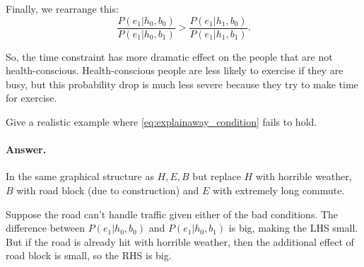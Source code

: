 \documentclass{discussion}
\begin{document}
Finally, we rearrange this:
\begin{equation}
\label{eq:explainaway_condition}
	\frac{P(e_1 | h_0, b_0)}{P(e_1 | h_0, b_1)} > \frac{P(e_1|h_1,b_0)}{P(e_1|h_1,b_1)}.
\end{equation}

So, the time constraint has more dramatic effect on the people that are not health-conscious. Health-conscious people are less likely to exercise if they are busy, but this probability drop is much less severe because they try to make time for exercise.

\begin{exercise}
	Give a realistic example where \eqref{eq:explainaway_condition} fails to hold.
\end{exercise}

\paragraph{Answer.}	In the same graphical structure as $H,E,B$ but replace $H$ with horrible weather, $B$ with road block (due to construction) and $E$ with extremely long commute. 

	Suppose the road can't handle traffic given either of the bad conditions. The difference between $P(e_1| h_0, b_0)$ and $P(e_1 | h_0, b_1)$ is big, making the LHS small. But if the road is already hit with horrible weather, then the additional effect of road block is small, so the RHS is big.
\end{document}
